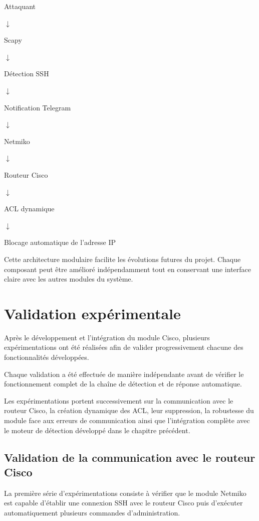 \begin{center}

Attaquant

$\downarrow$

Scapy

$\downarrow$

Détection SSH

$\downarrow$

Notification Telegram

$\downarrow$

Netmiko

$\downarrow$

Routeur Cisco

$\downarrow$

ACL dynamique

$\downarrow$

Blocage automatique de l'adresse IP

\end{center}

Cette architecture modulaire facilite les évolutions futures du projet. Chaque composant peut être amélioré indépendamment tout en conservant une interface claire avec les autres modules du système.

\section{Validation expérimentale}

Après le développement et l'intégration du module Cisco, plusieurs expérimentations ont été réalisées afin de valider progressivement chacune des fonctionnalités développées.

Chaque validation a été effectuée de manière indépendante avant de vérifier le fonctionnement complet de la chaîne de détection et de réponse automatique.

Les expérimentations portent successivement sur la communication avec le routeur Cisco, la création dynamique des ACL, leur suppression, la robustesse du module face aux erreurs de communication ainsi que l'intégration complète avec le moteur de détection développé dans le chapitre précédent.

\subsection{Validation de la communication avec le routeur Cisco}

La première série d'expérimentations consiste à vérifier que le module Netmiko est capable d'établir une connexion SSH avec le routeur Cisco puis d'exécuter automatiquement plusieurs commandes d'administration.


